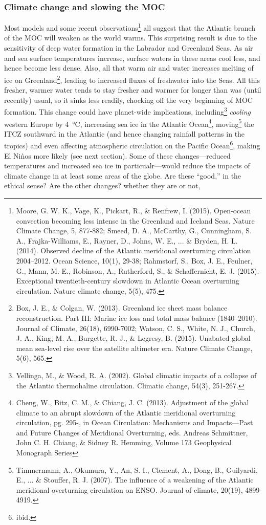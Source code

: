 \documentclass[amstex,12pt]{book}
\begin{document}
{\subsubsection{Climate change and slowing the MOC}
Most models and some recent observations\footnote{Moore, G. W. K., Vage, K., Pickart, R., \& Renfrew, I. (2015). Open-ocean convection becoming less intense in the Greenland and Iceland Seas. Nature Climate Change, 5, 877-882; Smeed, D. A., McCarthy, G., Cunningham, S. A., Frajka-Williams, E., Rayner, D., Johns, W. E., ... \& Bryden, H. L. (2014). Observed decline of the Atlantic meridional overturning circulation 2004–2012. Ocean Science, 10(1), 29-38; Rahmstorf, S., Box, J. E., Feulner, G., Mann, M. E., Robinson, A., Rutherford, S., \& Schaffernicht, E. J. (2015). Exceptional twentieth-century slowdown in Atlantic Ocean overturning circulation. Nature climate change, 5(5), 475.} all suggest that the Atlantic branch of the MOC will weaken as the world warms. This surprising result is due to the sensitivity of deep water formation in the Labrador and Greenland Seas. As air and sea surface temperatures increase, surface waters in these areas cool less, and hence become less dense. Also, all that warm air and water increases melting of ice on Greenland\footnote{Box, J. E., \& Colgan, W. (2013). Greenland ice sheet mass balance reconstruction. Part III: Marine ice loss and total mass balance (1840–2010). Journal of Climate, 26(18), 6990-7002; Watson, C. S., White, N. J., Church, J. A., King, M. A., Burgette, R. J., \& Legresy, B. (2015). Unabated global mean sea-level rise over the satellite altimeter era. Nature Climate Change, 5(6), 565.}, leading to increased fluxes of freshwater into the Seas. All this fresher, warmer water tends to stay fresher and warmer for longer than was (until recently) usual, so it sinks less readily, chocking off the very beginning of MOC formation. This change could have planet-wide implications, including\footnote{Vellinga, M., \& Wood, R. A. (2002). Global climatic impacts of a collapse of the Atlantic thermohaline circulation. Climatic change, 54(3), 251-267.} \emph{cooling} western Europe by \SI{4}{\celsius}, increasing sea ice in the Atlantic Ocean\footnote{Cheng, W., Bitz, C. M., \& Chiang, J. C. (2013). Adjustment of the global climate to an abrupt slowdown of the Atlantic meridional overturning circulation, pg. 295-, in Ocean Circulation: Mechanisms and Impacts—Past and Future Changes of Meridional Overturning, eds. Andreas Schmittner, John C. H. Chiang, \& Sidney R. Hemming, Volume 173 Geophysical Monograph Series}, moving\footnote{Timmermann, A., Okumura, Y., An, S. I., Clement, A., Dong, B., Guilyardi, E., ... \& Stouffer, R. J. (2007). The influence of a weakening of the Atlantic meridional overturning circulation on ENSO. Journal of climate, 20(19), 4899-4919.} the ITCZ southward in the Atlantic (and hence changing rainfall patterns in the tropics) and even affecting atmospheric circulation on the Pacific Ocean\footnote{ibid.}, making El Ni\`nos more likely (see next section). Some of these changes---reduced temperatures and increased sea ice in particualr---would reduce the impacts of climate change in at least some areas of the globe. Are these ``good,'' in the ethical sense? Are the other changes? whether they are or not, }
\end{document}
